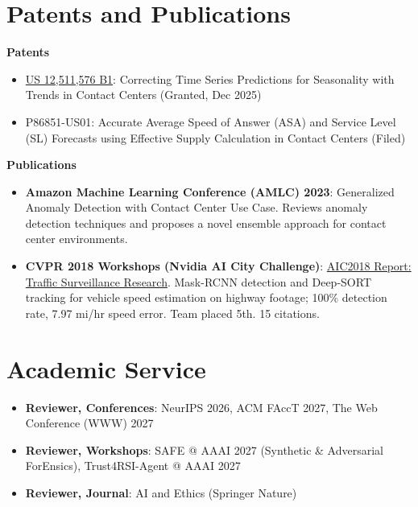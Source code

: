 \documentclass[a4paper,20pt]{article}
\begin{document}
\section{Patents and Publications}
\textbf{Patents}
\begin{itemize}[leftmargin=*, itemsep=0pt, topsep=1pt]
  \item \href{https://patentsgazette.uspto.gov/week52/OG/html/1541-5/US12511576-20251230.html}{US 12,511,576 B1}: Correcting Time Series Predictions for Seasonality with Trends in Contact Centers (Granted, Dec 2025)
  \item P86851-US01: Accurate Average Speed of Answer (ASA) and Service Level (SL) Forecasts using Effective Supply Calculation in Contact Centers (Filed)
\end{itemize}
\textbf{Publications}
\begin{itemize}[leftmargin=*, itemsep=0pt, topsep=1pt]
  \item \textbf{Amazon Machine Learning Conference (AMLC) 2023}: Generalized Anomaly Detection with Contact Center Use Case. Reviews anomaly detection techniques and proposes a novel ensemble approach for contact center environments.
  \item \textbf{CVPR 2018 Workshops (Nvidia AI City Challenge)}: \href{https://openaccess.thecvf.com/content_cvpr_2018_workshops/w3/html/Mao_AIC2018_Report_Traffic_CVPR_2018_paper.html}{AIC2018 Report: Traffic Surveillance Research}. Mask-RCNN detection and Deep-SORT tracking for vehicle speed estimation on highway footage; 100\% detection rate, 7.97 mi/hr speed error. Team placed 5th. 15 citations.
\end{itemize}

\section{Academic Service}
\begin{itemize}[leftmargin=*, itemsep=0pt, topsep=1pt]
  \item \textbf{Reviewer, Conferences}: NeurIPS 2026, ACM FAccT 2027, The Web Conference (WWW) 2027
  \item \textbf{Reviewer, Workshops}: SAFE @ AAAI 2027 (Synthetic \& Adversarial ForEnsics), Trust4RSI-Agent @ AAAI 2027
  \item \textbf{Reviewer, Journal}: AI and Ethics (Springer Nature)
\end{itemize}

\end{document}
